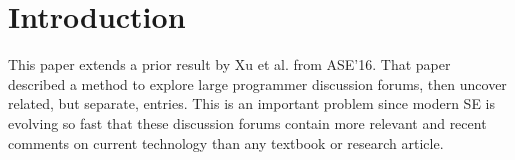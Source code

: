 \documentclass[sigconf,review, anonymous]{acmart}
\theoremstyle{break}
\begin{document}
%
%





\maketitle

% 


\section{Introduction}


This paper extends a prior result by
 Xu et al.\cite{xu2016predicting} from  ASE'16.  That paper described
 a method to
 explore large programmer discussion forums, then 
 uncover related, but separate, entries.
 This is an important problem since modern SE
 is evolving so fast that these discussion forums
 contain more relevant and recent comments on 
 current technology than any textbook or research article.
 
\end{document}
